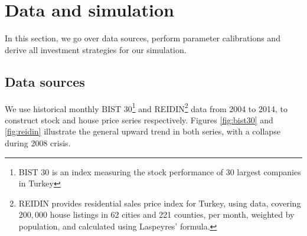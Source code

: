 \chapter{Data and simulation}
\label{data}

In this section, we go over data sources, perform parameter calibrations and derive all investment strategies for our simulation.

\section{Data sources}

We use historical monthly BIST 30\footnote{BIST 30 is an index measuring the stock performance of 30 largest companies in Turkey} and REIDIN\footnote{REIDIN provides residential sales price index for Turkey, using data, covering $200,000$ house listings in 62 cities and 221 counties, per month, weighted by population, and calculated using Laspeyres' formula.} data from 2004 to 2014, to construct stock and house price series respectively. Figures \ref{fig:bist30} and \ref{fig:reidin} illustrate the general upward trend in both series, with a collapse during 2008 crisis.

